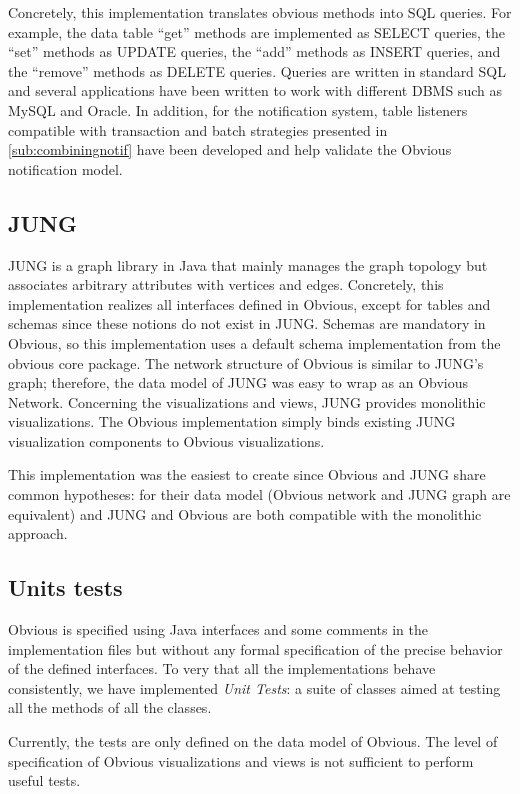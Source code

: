 Concretely, this implementation translates obvious methods into SQL
queries.  For example, the data table ``get'' methods are implemented
as SELECT queries, the ``set'' methods as UPDATE queries, the ``add''
methods as INSERT queries, and the ``remove'' methods as DELETE
queries.  Queries are written in standard SQL and several applications
have been written to work with different DBMS such as MySQL and
Oracle.  In addition, for the notification system, table listeners
compatible with transaction and batch strategies presented in
\ref{sub:combiningnotif} have been developed and help validate the
Obvious notification model.

\subsection{JUNG}

JUNG is a graph library in Java that mainly manages the graph topology
but associates arbitrary attributes with vertices and edges.
Concretely, this implementation realizes all interfaces defined in
Obvious, except for tables and schemas since these notions do not
exist in JUNG.  Schemas are mandatory in Obvious, so this
implementation uses a default schema implementation from the obvious
core package.  The network structure of Obvious is similar to JUNG's
graph; therefore, the data model of JUNG was easy to wrap as an
Obvious Network.  Concerning the visualizations and views, JUNG
provides monolithic visualizations.  The Obvious implementation simply
binds existing JUNG visualization components to Obvious visualizations.

This implementation was the easiest to create since Obvious and JUNG
share common hypotheses: for their data model (Obvious network and
JUNG graph are equivalent) and JUNG and Obvious are both compatible
with the monolithic approach.  


\subsection{Units tests}
\label{sub:unittests}

Obvious is specified using Java interfaces and some comments in the
implementation files but without any formal specification of the
precise behavior of the defined interfaces.  To very that all the
implementations behave consistently, we have implemented \emph{Unit
  Tests}: a suite of classes aimed at testing all the methods of all
the classes.

Currently, the tests are only defined on the data model of Obvious.
The level of specification of Obvious visualizations and views is not
sufficient to perform useful tests.


